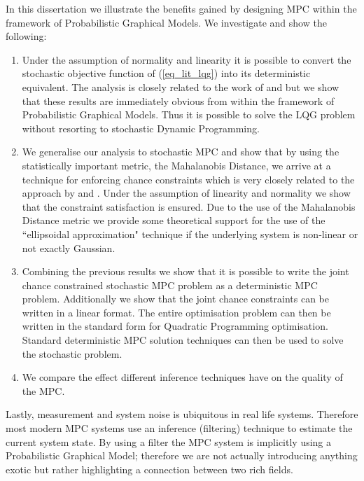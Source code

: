 In this dissertation we illustrate the benefits gained by designing MPC within the framework of Probabilistic Graphical Models. We investigate and show the following:
\begin{enumerate}
\item
Under the assumption of normality and linearity it is possible to convert the stochastic objective function of (\ref{eq_lit_lqg}) into its deterministic equivalent. The analysis is closely related to the work of  \cite{yan1} and \cite{yan2} but we show that these results are immediately obvious from within the framework of Probabilistic Graphical Models. Thus it is possible to solve the LQG problem without resorting to stochastic Dynamic Programming.
\item
We generalise our analysis to stochastic MPC and show that by using the statistically important metric, the Mahalanobis Distance, we arrive at a technique for enforcing chance constraints which is very closely related to the approach by \cite{vanhessem2} and \cite{vanhessem1}. Under the assumption of linearity and normality we show that the constraint satisfaction is ensured. Due to the use of the Mahalanobis Distance metric we provide some theoretical support for the use of the ``ellipsoidal approximation" technique if the underlying system is non-linear or not exactly Gaussian.
\item
Combining the previous results we show that it is possible to write the joint chance constrained stochastic MPC problem as a deterministic MPC problem. Additionally we show that the joint chance constraints can be written in a linear format. The entire optimisation problem can then be written in the standard form for Quadratic Programming optimisation. Standard deterministic MPC solution techniques can then be used to solve the stochastic problem.
\item
We compare the effect different inference techniques have on the quality of the MPC.
\end{enumerate}
Lastly, measurement and system noise is ubiquitous in real life systems. Therefore most modern MPC systems use an inference (filtering) technique to estimate the current system state. By using a filter the MPC system is implicitly using a Probabilistic Graphical Model; therefore we are not actually introducing anything exotic but rather highlighting a connection between two rich fields. 

